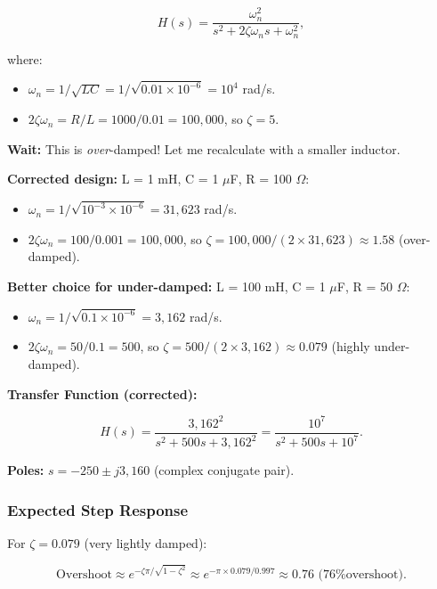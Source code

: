\documentclass[11pt,letterpaper]{article}
\begin{document}
\begin{equation}
H(s) = \frac{\omega_n^2}{s^2 + 2\zeta \omega_n s + \omega_n^2},
\end{equation}

\noindent
where:
\begin{itemize}
    \item $\omega_n = 1/\sqrt{LC} = 1/\sqrt{0.01 \times 10^{-6}} = 10^4$ rad/s.
    \item $2\zeta \omega_n = R/L = 1000 / 0.01 = 100,000$, so $\zeta = 5$.
\end{itemize}

\noindent
\textbf{Wait:} This is \textit{over}-damped! Let me recalculate with a smaller inductor.

\noindent
\textbf{Corrected design:} L = 1 mH, C = 1 $\mu$F, R = 100 $\Omega$:
\begin{itemize}
    \item $\omega_n = 1/\sqrt{10^{-3} \times 10^{-6}} = 31,623$ rad/s.
    \item $2\zeta \omega_n = 100 / 0.001 = 100,000$, so $\zeta = 100,000 / (2 \times 31,623) \approx 1.58$ (over-damped).
\end{itemize}

\noindent
\textbf{Better choice for under-damped:} L = 100 mH, C = 1 $\mu$F, R = 50 $\Omega$:
\begin{itemize}
    \item $\omega_n = 1/\sqrt{0.1 \times 10^{-6}} = 3,162$ rad/s.
    \item $2\zeta \omega_n = 50 / 0.1 = 500$, so $\zeta = 500 / (2 \times 3,162) \approx 0.079$ (highly under-damped).
\end{itemize}

\noindent
\textbf{Transfer Function (corrected):}

\begin{equation}
H(s) = \frac{3,162^2}{s^2 + 500 s + 3,162^2} = \frac{10^7}{s^2 + 500 s + 10^7}.
\end{equation}

\noindent
\textbf{Poles:} $s = -250 \pm j 3,160$ (complex conjugate pair).

\subsubsection*{Expected Step Response}

For $\zeta = 0.079$ (very lightly damped):

\begin{equation}
\text{Overshoot} \approx e^{-\zeta \pi / \sqrt{1 - \zeta^2}} \approx e^{-\pi \times 0.079 / 0.997} \approx 0.76 \text{ (76\% overshoot)}.
\end{equation}
\end{document}
